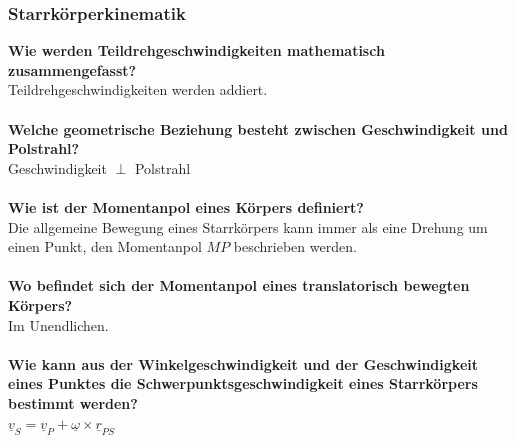 \documentclass[a4paper,twocolumn,10pt]{article}
\begin{document}
\subsubsection{Starrkörperkinematik}
\textbf{Wie werden Teildrehgeschwindigkeiten mathematisch zusammengefasst?}\\
Teildrehgeschwindigkeiten werden addiert.\\\\
\textbf{Welche geometrische Beziehung besteht zwischen Geschwindigkeit und Polstrahl?}\\
Geschwindigkeit $\perp$ Polstrahl\\\\
\textbf{Wie ist der Momentanpol eines Körpers definiert?}\\
Die allgemeine Bewegung eines Starrkörpers kann immer als eine Drehung um einen Punkt, den Momentanpol $MP$ beschrieben werden.\\\\
\textbf{Wo befindet sich der Momentanpol eines translatorisch bewegten Körpers?}\\
Im Unendlichen.\\\\
\textbf{Wie kann aus der Winkelgeschwindigkeit und der Geschwindigkeit eines Punktes die Schwerpunktsgeschwindigkeit eines Starrkörpers bestimmt werden?}\\
$\underline{v}_S=\underline{v}_P+\underline{\omega}\times\underline{r}_{PS}$
\end{document}
